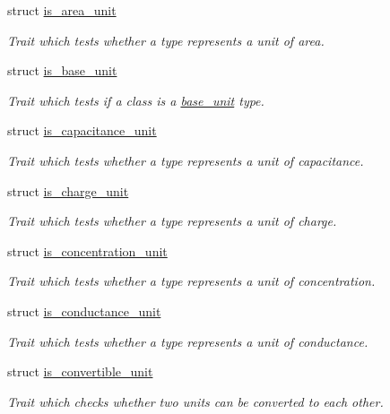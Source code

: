 \begin{DoxyCompactItemize}
struct \hyperlink{structunits_1_1traits_1_1is__area__unit}{is\+\_\+area\+\_\+unit}
\begin{DoxyCompactList}\small\item\em Trait which tests whether a type represents a unit of area. \end{DoxyCompactList}\item 
struct \hyperlink{structunits_1_1traits_1_1is__base__unit}{is\+\_\+base\+\_\+unit}
\begin{DoxyCompactList}\small\item\em Trait which tests if a class is a {\ttfamily \hyperlink{structunits_1_1base__unit}{base\+\_\+unit}} type. \end{DoxyCompactList}\item 
struct \hyperlink{structunits_1_1traits_1_1is__capacitance__unit}{is\+\_\+capacitance\+\_\+unit}
\begin{DoxyCompactList}\small\item\em Trait which tests whether a type represents a unit of capacitance. \end{DoxyCompactList}\item 
struct \hyperlink{structunits_1_1traits_1_1is__charge__unit}{is\+\_\+charge\+\_\+unit}
\begin{DoxyCompactList}\small\item\em Trait which tests whether a type represents a unit of charge. \end{DoxyCompactList}\item 
struct \hyperlink{structunits_1_1traits_1_1is__concentration__unit}{is\+\_\+concentration\+\_\+unit}
\begin{DoxyCompactList}\small\item\em Trait which tests whether a type represents a unit of concentration. \end{DoxyCompactList}\item 
struct \hyperlink{structunits_1_1traits_1_1is__conductance__unit}{is\+\_\+conductance\+\_\+unit}
\begin{DoxyCompactList}\small\item\em Trait which tests whether a type represents a unit of conductance. \end{DoxyCompactList}\item 
struct \hyperlink{structunits_1_1traits_1_1is__convertible__unit}{is\+\_\+convertible\+\_\+unit}
\begin{DoxyCompactList}\small\item\em Trait which checks whether two units can be converted to each other. \end{DoxyCompactList}\item 

\end{DoxyCompactItemize}
